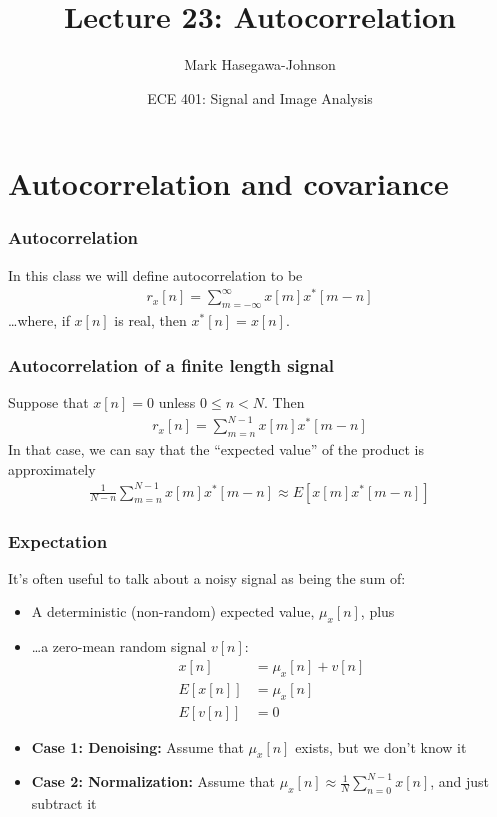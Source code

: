 \documentclass{beamer}
\title{Lecture 23: Autocorrelation}
\author{Mark Hasegawa-Johnson}
\date{ECE 401: Signal and Image Analysis}
\begin{document}
\begin{frame}
  \maketitle
\end{frame}

\begin{frame}
  \tableofcontents
\end{frame}

\section[Covariance]{Autocorrelation and covariance}

\begin{frame}
  \frametitle{Autocorrelation}

  In this class we will define autocorrelation to be
  \begin{align*}
    r_x[n] = \sum_{m=-\infty}^\infty x[m]x^*[m-n]
  \end{align*}
  \ldots where, if $x[n]$ is real, then $x^*[n]=x[n]$.
\end{frame}

\begin{frame}
  \frametitle{Autocorrelation of a finite length signal}

  Suppose that $x[n]=0$ unless $0\le n<N$.  Then
  \begin{align*}
    r_x[n] = \sum_{m=n}^{N-1} x[m]x^*[m-n]
  \end{align*}
  In that case, we can say that the ``expected value'' of the product
  is approximately
  \begin{align*}
    \frac{1}{N-n}\sum_{m=n}^{N-1} x[m]x^*[m-n] \approx E\left[x[m]x^*[m-n]\right]
  \end{align*}
\end{frame}

\begin{frame}
  \frametitle{Expectation}

  It's often useful to talk about a noisy signal as being the
  sum of:
  \begin{itemize}
  \item A deterministic (non-random) expected value, $\mu_x[n]$, plus
  \item \ldots a zero-mean random signal $v[n]$:
    \begin{align*}
      x[n] &= \mu_x[n] + v[n]\\
      E\left[x[n]\right] &= \mu_x[n]\\
      E\left[v[n]\right] &= 0
    \end{align*}
  \item \textbf{Case 1: Denoising:} Assume that $\mu_x[n]$ exists, but we don't know it
  \item \textbf{Case 2: Normalization:} Assume that
    $\mu_x[n]\approx\frac{1}{N}\sum_{n=0}^{N-1}x[n]$, and just subtract it
  \end{itemize}
\end{frame}
\end{document}
